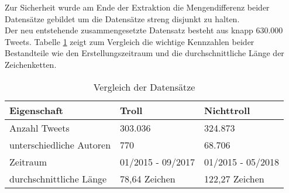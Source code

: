Zur Sicherheit wurde am Ende der Extraktion die Mengendifferenz beider Datensätze gebildet um die Datensätze streng disjunkt zu halten.\\
Der neu entstehende zusammengesetzte Datensatz besteht aus knapp 630.000 Tweets. 
Tabelle \ref{tab_datasets} zeigt zum Vergleich die wichtige Kennzahlen beider Bestandteile wie den Erstellungszeitraum und die durchschnittliche Länge der Zeichenketten.
\begin{table}[htb]
	\begin{center}
		\begin{tabular}{|l|l|l|}
			\hline
		Eigenschaft					& Troll		& Nichttroll\\ \hline \hline
		Anzahl Tweets   			& 303.036	& 324.873	\\ \hline
		unterschiedliche Autoren    & 770		& 68.706		\\ \hline
		Zeitraum					& 01/2015 - 09/2017& 01/2015 - 05/2018\\ \hline
		durchschnittliche Länge		& 78,64 Zeichen	& 122,27 Zeichen\\ \hline
		\end{tabular}
		\caption{Vergleich der Datensätze}\label{tab_datasets}
	\end{center}
\end{table}
\pagebreak